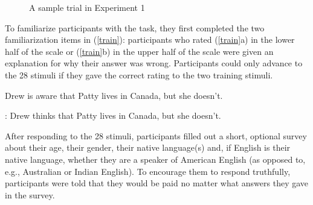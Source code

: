 \documentclass[11pt,fleqn]{article}
\newcommand{\6}{\mbox{$[\hspace*{-.6mm}[$}}
\newcommand{\9}{\mbox{$]\hspace*{-.6mm}]$}}
\begin{document}
\begin{figure}[h!]
\begin{center}
\end{center}
\caption{A sample trial in Experiment 1}\label{f-trial-exp2}
\end{figure}

To familiarize participants with the task, they first completed the two familiarization items in (\ref{train}): participants who rated (\ref{train}a) in the lower half of the scale or (\ref{train}b) in the upper half of the scale were given an explanation for why their answer was wrong. Participants could only advance to the 28 stimuli if they gave the correct rating to the two training stimuli.

\begin{exe}
\ex\label{train}
\begin{xlist}
 Drew is aware that Patty lives in Canada, but she doesn't.

: Drew thinks that Patty lives in Canada, but she doesn't.
\end{xlist}
\end{exe}

After responding to the 28 stimuli, participants filled out a short, optional survey about their age, their gender, their native language(s) and, if English is their native language, whether they are a speaker of American English (as opposed to, e.g., Australian or Indian English). To encourage them to respond truthfully, participants were told that they would be paid no matter what answers they gave in the survey.
\end{document}
